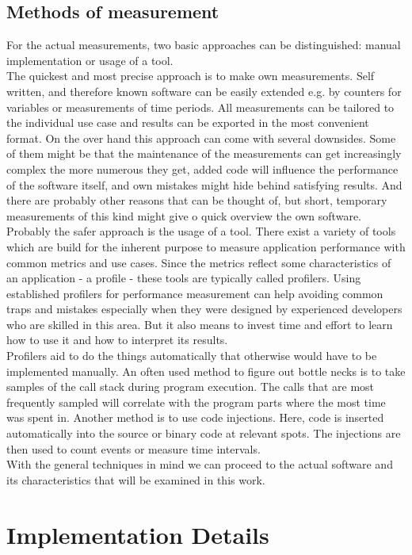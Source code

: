 \subsection{Methods of measurement}
For the actual measurements, two basic approaches can be distinguished: manual implementation or usage of a tool.\\
The quickest and most precise approach is to make own measurements. Self written, and therefore known software can be easily extended e.g. by counters for variables or measurements of time periods. All measurements can be tailored to the individual use case and results can be exported in the most convenient format. On the over hand this approach can come with several downsides. Some of them might be that the maintenance of the measurements can get increasingly complex the more numerous they get, added code will influence the performance of the software itself, and own mistakes might hide behind satisfying results. And there are probably other reasons that can be thought of, but short, temporary measurements of this kind might give o quick overview the own software.\\
Probably the safer approach is the usage of a tool. There exist a variety of tools which are build for the inherent purpose to measure application performance with common metrics and use cases. Since the metrics reflect some characteristics of an application - a profile - these tools are typically called profilers. Using established profilers for performance measurement can help avoiding common traps and mistakes especially when they were designed by experienced developers who are skilled in this area. But it also means to invest time and effort to learn how to use it and how to interpret its results.\\
Profilers aid to do the things automatically that otherwise would have to be implemented manually. An often used method to figure out bottle necks is to take samples of the call stack during program execution. The calls that are most frequently sampled will correlate with the program parts where the most time was spent in. Another method is to use code injections. Here, code is inserted automatically into the source or binary code at relevant spots. The injections are then used to count events or measure time intervals.\\
With the general techniques in mind we can proceed to the actual software and its characteristics that will be examined in this work.

\section{Implementation Details}
